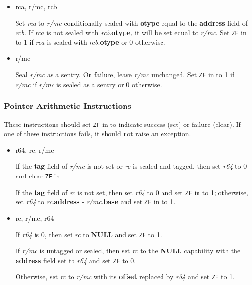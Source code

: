 \begin{itemize}
  \item {} rca, r/mc, rcb

    Set \emph{rca} to \emph{r/mc} conditionally sealed with
    \textbf{otype} equal to the \textbf{address} field of \emph{rcb}.
    If \emph{rca} is not sealed with \emph{rcb}.\textbf{otype}, it
    will be set equal to \emph{r/mc}.  Set \texttt{ZF} in \RFLAGS{} to
    1 if \emph{rca} is sealed with \emph{rcb}.\textbf{otype} or 0
    otherwise.

  \item {} r/mc

    Seal \emph{r/mc} as a sentry.  On failure, leave \emph{r/mc}
    unchanged.  Set \texttt{ZF} in \RFLAGS{} to 1 if \emph{r/mc} if
    \emph{r/mc} is sealed as a sentry or 0 otherwise.
\end{itemize}

\subsubsection{Pointer-Arithmetic Instructions}

These instructions should set \texttt{ZF} in \RFLAGS{} to indicate
success (set) or failure (clear).  If one of these instructions fails, it
should not raise an exception.

\begin{itemize}
  \item {} r64, rc, r/mc

    If the \textbf{tag} field of \emph{r/mc} is not set or \emph{rc}
    is sealed and tagged, then set \emph{r64} to 0 and clear
    \texttt{ZF} in \RFLAGS{}.

    If the \textbf{tag} field of \emph{rc} is not set, then set
    \emph{r64} to 0 and set \texttt{ZF} in \RFLAGS{} to 1; otherwise,
    set \emph{r64} to \emph{rc}.\textbf{address} -
    \emph{r/mc}.\textbf{base} and set \texttt{ZF} in \RFLAGS{} to 1.

  \item {} rc, r/mc, r64

    If \emph{r64} is 0, then set \emph{rc} to \textbf{NULL} and set
    \texttt{ZF} to 1.

    If \emph{r/mc} is untagged or sealed, then set \emph{rc} to the
    \textbf{NULL} capability with the \textbf{address} field set to
    \emph{r64} and set \texttt{ZF} to 0.

    Otherwise, set \emph{rc} to \emph{r/mc} with its \textbf{offset}
    replaced by \emph{r64} and set \texttt{ZF} to 1.
\end{itemize}

